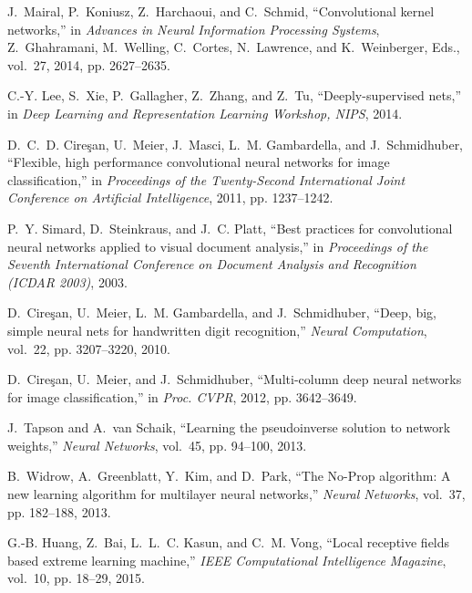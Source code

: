\documentclass[conference]{IEEEtran}
\begin{document}
\begin{thebibliography}{10}
J.~Mairal, P.~Koniusz, Z.~Harchaoui, and C.~Schmid, ``Convolutional kernel
  networks,'' in \emph{Advances in Neural Information Processing Systems},
  Z.~Ghahramani, M.~Welling, C.~Cortes, N.~Lawrence, and K.~Weinberger, Eds.,
  vol.~27, 2014, pp. 2627--2635.

C.-Y. Lee, S.~Xie, P.~Gallagher, Z.~Zhang, and Z.~Tu, ``Deeply-supervised
  nets,'' in \emph{Deep Learning and Representation Learning Workshop, NIPS},
  2014.

D.~C.~D. Cire{\c{s}}an, U.~Meier, J.~Masci, L.~M. Gambardella, and
  J.~Schmidhuber, ``Flexible, high performance convolutional neural networks
  for image classification,'' in \emph{Proceedings of the Twenty-Second
  International Joint Conference on Artificial Intelligence}, 2011, pp.
  1237--1242.

P.~Y. Simard, D.~Steinkraus, and J.~C. Platt, ``Best practices for
  convolutional neural networks applied to visual document analysis,'' in
  \emph{Proceedings of the Seventh International Conference on Document
  Analysis and Recognition (ICDAR 2003)}, 2003.

D.~Cire{\c{s}}an, U.~Meier, L.~M. Gambardella, and J.~Schmidhuber, ``Deep, big,
  simple neural nets for handwritten digit recognition,'' \emph{Neural
  Computation}, vol.~22, pp. 3207--3220, 2010.

D.~Cire{\c{s}}an, U.~Meier, and J.~Schmidhuber, ``Multi-column deep neural
  networks for image classification,'' in \emph{Proc. CVPR}, 2012, pp.
  3642--3649.

J.~Tapson and A.~{van Schaik}, ``Learning the pseudoinverse solution to network
  weights,'' \emph{Neural Networks}, vol.~45, pp. 94--100, 2013.

B.~Widrow, A.~Greenblatt, Y.~Kim, and D.~Park, ``The {No-Prop} algorithm: {A}
  new learning algorithm for multilayer neural networks,'' \emph{Neural
  Networks}, vol.~37, pp. 182--188, 2013.

G.-B. Huang, Z.~Bai, L.~L.~C. Kasun, and C.~M. Vong, ``Local receptive fields
  based extreme learning machine,'' \emph{IEEE Computational Intelligence
  Magazine}, vol.~10, pp. 18--29, 2015.

\end{thebibliography}




\end{document}
